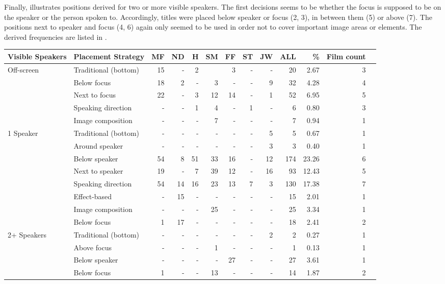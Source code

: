 Finally,  illustrates positions derived for two or more visible speakers. The first decisions seems to be whether the focus is supposed to be on the speaker or the person spoken to. Accordingly, titles were placed below speaker or focus (2, 3), in between them (5) or above (7). The positions next to speaker and focus (4, 6) again only seemed to be used in order not to cover important image areas or elements. The derived frequencies are listed in .


\begin{sidewaystable}
\small
\begin{tabularx}{\textwidth}{lQrrrrrrrrrr>{\raggedleft}p{6mm}}
\lsptoprule
 Visible Speakers &  Placement Strategy &  MF &  ND &  H &  SM &  FF &  ST &  JW &  ALL &  \% &  Film count\\
 \midrule
Off-screen & Traditional (bottom) & 15 & - & 2 &  & 3 & - & - & 20 & 2.67 & 3\\
& Below focus & 18 & 2 & - & 3 & - & - & 9 & 32 & 4.28 & 4\\
& Next to focus & 22 & - & 3 & 12 & 14 & - & 1 & 52 & 6.95 & 5\\
& Speaking direction & - & - & 1 & 4 & - & 1 & - & 6 & 0.80 & 3\\
& Image composition & - & - & - & 7 & - & - & - & 7 & 0.94 & 1\\
1 Speaker & Traditional (bottom) & - & - & - & - & - & - & 5 & 5 & 0.67 & 1\\
& Around speaker & - & - & - & - & - & - & 3 & 3 & 0.40 & 1\\
& Below speaker & 54 & 8 & 51 & 33 & 16 & - & 12 & 174 & 23.26 & 6\\
& Next to speaker & 19 & - & 7 & 39 & 12 & - & 16 & 93 & 12.43 & 5\\
& Speaking direction & 54 & 14 & 16 & 23 & 13 & 7 & 3 & 130 & 17.38 & 7\\
& Effect-based & - & 15 & - & - & - & - & - & 15 & 2.01 & 1\\
& Image composition & - & - & - & 25 & - & - & - & 25 & 3.34 & 1\\
& Below focus & 1 & 17 & - & - & - & - & - & 18 & 2.41 & 2\\
2+ Speakers & Traditional (bottom) & - & - & - & - & - & - & 2 & 2 & 0.27 & 1\\
& Above focus & - & - & - & 1 & - & - & - & 1 & 0.13 & 1\\
& Below speaker & - & - & - & - & 27 & - & - & 27 & 3.61 & 1\\
& Below focus & 1 & - & - & 13 & - & - & - & 14 & 1.87 & 2\\

\end{tabularx}
\end{sidewaystable}
